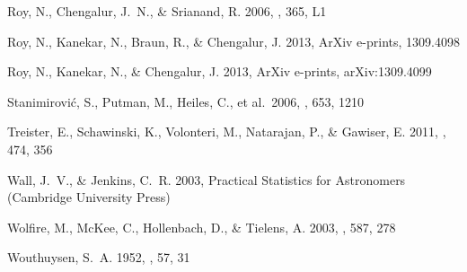 \documentclass{aastex}
\begin{document}
\begin{thebibliography}{}
{Roy}, N., {Chengalur}, J.~N., \& {Srianand}, R. 2006, \mnras, 365, L1

{Roy}, N., {Kanekar}, N., {Braun}, R., \& {Chengalur}, J. 2013{},
  ArXiv e-prints, 1309.4098

{Roy}, N., {Kanekar}, N., \& {Chengalur}, J. 2013{}, ArXiv
  e-prints, arXiv:1309.4099
  
Stanimirovi{\'c}, S., Putman, M., Heiles, C., et al.\ 2006, \apj, 653, 1210 

{Treister}, E., {Schawinski}, K., {Volonteri}, M., {Natarajan}, P., \&
  {Gawiser}, E. 2011, \nat, 474, 356

{Wall}, J.~V., \& {Jenkins}, C.~R. 2003, {Practical Statistics for Astronomers}
  (Cambridge University Press)

{Wolfire}, M., {McKee}, C., {Hollenbach}, D., \& {Tielens}, A. 2003, \apj, 587,
  278

{Wouthuysen}, S.~A. 1952, \aj, 57, 31


\end{thebibliography}



\label{lastpage}
\end{document}
